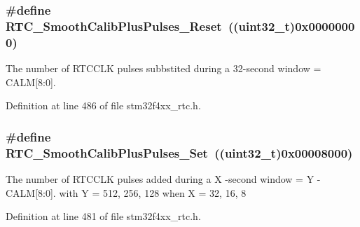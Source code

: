\hypertarget{group___r_t_c___smooth__calib___plus__pulses___definitions_ga13d843306f6d3cd22e2443f45f191fe8}{
\subsubsection[{R\-T\-C\-\_\-\-Smooth\-Calib\-Plus\-Pulses\-\_\-\-Reset}]{\setlength{\rightskip}{0pt plus 5cm}\#define R\-T\-C\-\_\-\-Smooth\-Calib\-Plus\-Pulses\-\_\-\-Reset~((uint32\-\_\-t)0x00000000)}}\label{group___r_t_c___smooth__calib___plus__pulses___definitions_ga13d843306f6d3cd22e2443f45f191fe8}
The number of R\-T\-C\-C\-L\-K pulses subbstited during a 32-\/second window = C\-A\-L\-M\mbox{[}8\-:0\mbox{]}. 

Definition at line 486 of file stm32f4xx\-\_\-rtc.\-h.

\hypertarget{group___r_t_c___smooth__calib___plus__pulses___definitions_ga48a2b554e653139e8fda1d4ffd470144}{
\subsubsection[{R\-T\-C\-\_\-\-Smooth\-Calib\-Plus\-Pulses\-\_\-\-Set}]{\setlength{\rightskip}{0pt plus 5cm}\#define R\-T\-C\-\_\-\-Smooth\-Calib\-Plus\-Pulses\-\_\-\-Set~((uint32\-\_\-t)0x00008000)}}\label{group___r_t_c___smooth__calib___plus__pulses___definitions_ga48a2b554e653139e8fda1d4ffd470144}
The number of R\-T\-C\-C\-L\-K pulses added during a X -\/second window = Y -\/ C\-A\-L\-M\mbox{[}8\-:0\mbox{]}. with Y = 512, 256, 128 when X = 32, 16, 8 

Definition at line 481 of file stm32f4xx\-\_\-rtc.\-h.

